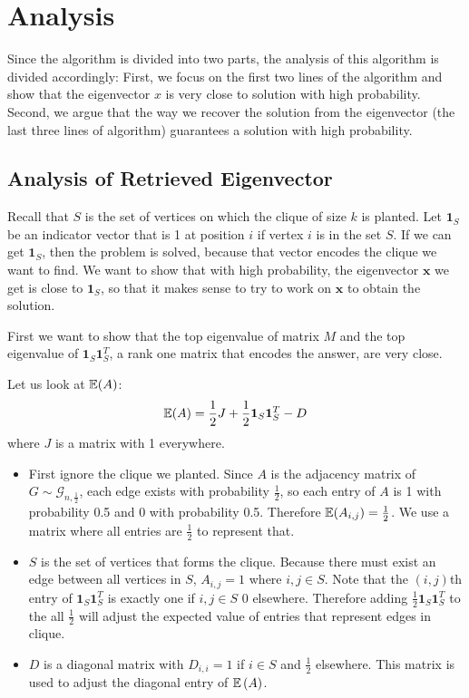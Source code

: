 \documentclass{article}
\begin{document}
\section{Analysis}
Since the algorithm is divided into two parts, the analysis of this algorithm is divided accordingly: First, we focus on the first two lines of the algorithm and show that the eigenvector $x$ is very close to solution with high probability. Second, we argue that the way we recover the solution from the eigenvector (the last three lines of algorithm) guarantees a solution with high probability. 

\subsection{Analysis of Retrieved Eigenvector}
Recall that $S$ is the set of vertices on which the clique of size $k$ is planted.
Let $\mathbf{1}_S$ be an indicator vector that is 1 at position $i$ if vertex
$i$ is in the set $S$. If we can get $\mathbf{1}_S$, then the problem is
solved, because that vector encodes the clique we want to find. We want to show
that with high probability, the eigenvector $\mathbf{x}$ we get is close to
$\mathbf{1}_S$, so that it makes sense to try to work on $\mathbf{x}$ to obtain the solution.

First we want to show that the top eigenvalue of matrix $M$ and the top eigenvalue of $\mathbf{1}_S\mathbf{1}_S^T$, a rank one matrix that encodes the answer, are very close. 

Let us look at $\operatorname{\mathbb{E}}(A)$: 
$$\operatorname{\mathbb{E}}(A) = \frac{1}{2}J + \frac{1}{2}\mathbf{1}_S\mathbf{1}_S^T - D$$
where  $J$ is a matrix with 1 everywhere. 

\begin{itemize}
    \item First ignore the clique we planted. Since $A$ is the adjacency matrix of $G
        \sim \mathcal{G}_{n, \frac{1}{2}}$, each edge exists with probability $\frac{1}{2}$, so each entry of $A$ is 1 with probability 0.5 and 0 with probability 0.5. Therefore $\operatorname{\mathbb{E}}(A_{i,j}) = \frac{1}{2}$. We use a matrix where all entries are $\frac{1}{2}$ to represent that.

    \item $S$ is the set of vertices that forms the clique. Because there must
        exist an edge between all vertices in $S$, $A_{i,j} = 1$ where $i, j
        \in S$. Note that the $(i, j)$th entry of $\mathbf{1}_S\mathbf{1}_S^T$ is exactly one if $i,j \in S$ 0 elsewhere. Therefore adding $\frac{1}{2}\mathbf{1}_S\mathbf{1}_S^T$ to the all $\frac{1}{2}$ will adjust the expected value of entries that represent edges in clique.

    \item $D$ is a diagonal matrix with $D_{i,i} = 1$ if $i\in S$ and
        $\frac{1}{2}$ elsewhere. This matrix is used to adjust the diagonal
        entry of $\operatorname{\mathbb{E}}{(A)}$.
\end{itemize}
\end{document}
